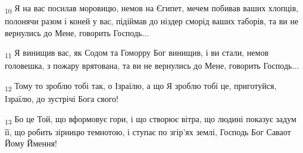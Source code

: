 \begin{tcolorbox}
\textsubscript{10} Я на вас посилав моровицю, немов на Єгипет, мечем побивав ваших хлопців, полонячи разом і коней у вас, підіймав до ніздер сморід ваших таборів, та ви не вернулись до Мене, говорить Господь...
\end{tcolorbox}
\begin{tcolorbox}
\textsubscript{11} Я винищив вас, як Содом та Гоморру Бог винищив, і ви стали, немов головешка, з пожару врятована, та ви не вернулись до Мене, говорить Господь...
\end{tcolorbox}
\begin{tcolorbox}
\textsubscript{12} Тому то зроблю тобі так, о Ізраїлю, а що Я зроблю тобі це, приготуйся, Ізраїлю, до зустрічі Бога свого!
\end{tcolorbox}
\begin{tcolorbox}
\textsubscript{13} Бо це Той, що вформовує гори, і що створює вітра, що людині показує задум її, що робить зірницю темнотою, і ступає по згір'ях землі, Господь Бог Саваот Йому Ймення!
\end{tcolorbox}
